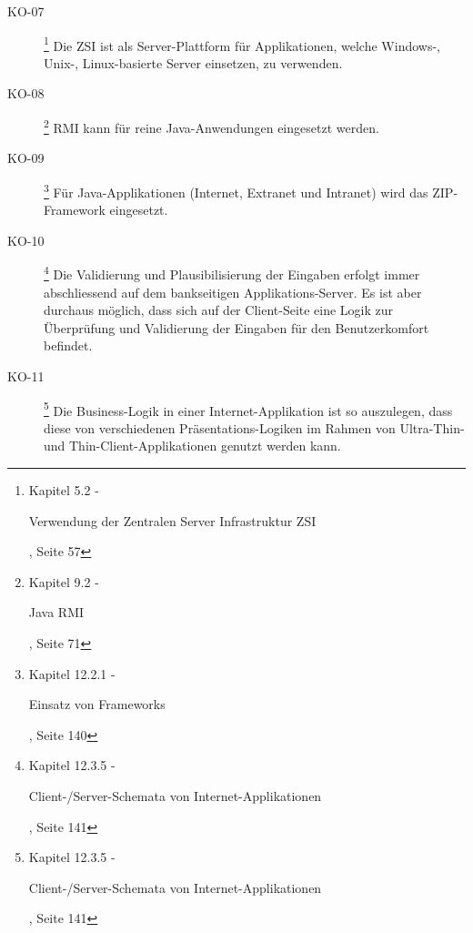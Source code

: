 \begin{description}
    \item[KO-07\label{itm:KO-07}]
    \footnote{\cite{ZkbHandbuchDerItArchitektur} Kapitel 5.2 -
    \begin{itshape}Verwendung der Zentralen Server Infrastruktur
    ZSI\end{itshape}, Seite 57}
    Die \ac{ZSI} ist als Server-Plattform für Applikationen, welche Windows-,
    Unix-, Linux-basierte Server einsetzen, zu verwenden.
    
    \item[KO-08\label{itm:KO-08}]
    \footnote{\cite{ZkbHandbuchDerItArchitektur} Kapitel 9.2 -
    \begin{itshape}Java RMI\end{itshape}, Seite 71}
    RMI kann für reine Java-Anwendungen eingesetzt werden.
    
    \item[KO-09\label{itm:KO-09}]
    \footnote{\cite{ZkbHandbuchDerItArchitektur} Kapitel 12.2.1 -
    \begin{itshape}Einsatz von Frameworks\end{itshape}, Seite 140}
    Für Java-Applikationen (Internet, Extranet und Intranet) wird das
    ZIP-Framework eingesetzt.
    
    \item[KO-10\label{itm:KO-10}]
    \footnote{\cite{ZkbHandbuchDerItArchitektur} Kapitel 12.3.5 -
    \begin{itshape}Client-/Server-Schemata von Internet-Applikationen\end{itshape}, Seite 141}
    Die Validierung und Plausibilisierung der Eingaben erfolgt immer
    abschliessend auf dem bankseitigen Applikations-Server. Es ist aber
    durchaus möglich, dass sich auf der Client-Seite eine Logik zur Überprüfung
    und Validierung der Eingaben für den Benutzerkomfort befindet.
    
    \item[KO-11\label{itm:KO-11}]
    \footnote{\cite{ZkbHandbuchDerItArchitektur} Kapitel 12.3.5 -
    \begin{itshape}Client-/Server-Schemata von Internet-Applikationen\end{itshape}, Seite 141}
    Die Business-Logik in einer Internet-Applikation ist so auszulegen, dass
    diese von verschiedenen Präsentations-Logiken im Rahmen von Ultra-Thin- und
    Thin-Client-Applikationen genutzt werden kann.
    

\end{description}
